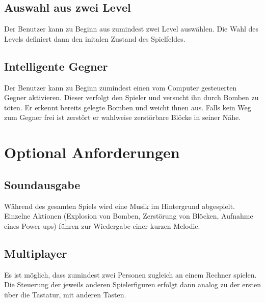 \documentclass[12pt]{article}
\begin{document}
\subsection{Auswahl aus zwei Level}
Der Benutzer kann zu Beginn aus zumindest zwei Level auswählen. Die Wahl des Levels definiert dann den initalen Zustand des Spielfeldes.
\subsection{Intelligente Gegner}
Der Benutzer kann zu Beginn zumindest einen vom Computer gesteuerten Gegner aktivieren. Dieser verfolgt den Spieler und versucht ihn durch Bomben zu töten. Er erkennt bereits gelegte Bomben und weicht ihnen aus. Falls kein Weg zum Gegner frei ist zerstört er wahlweise zerstörbare Blöcke in seiner Nähe.

\section{Optional Anforderungen}
\subsection{Soundausgabe}
Während des gesamten Spiels wird eine Musik im Hintergrund abgespielt. Einzelne Aktionen (Explosion von Bomben, Zerstörung von Blöcken, Aufnahme eines Power-ups) führen zur Wiedergabe einer kurzen Melodie.
\subsection{Multiplayer}
Es ist möglich, dass zumindest zwei Personen zugleich an einem Rechner spielen. Die Steuerung der jeweils anderen Spielerfiguren erfolgt dann analog zu der ersten über die Tastatur, mit anderen Tasten.
\end{document}
